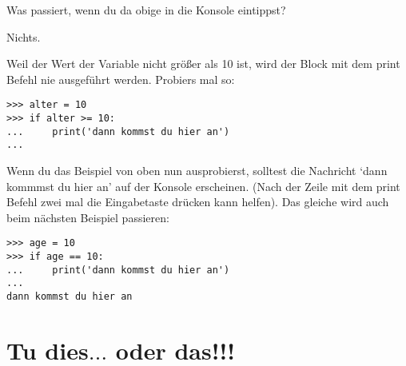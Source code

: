 \noindent
Was passiert, wenn du da obige in die Konsole eintippst?
\par
\noindent
Nichts.
\par
\noindent
Weil der Wert der Variable  nicht größer als 10 ist, wird der Block mit dem print Befehl nie ausgeführt werden. Probiers mal so:

\begin{Verbatim}[frame=single]
>>> alter = 10
>>> if alter >= 10:
...     print('dann kommst du hier an')
...
\end{Verbatim}

Wenn du das Beispiel von oben nun ausprobierst, solltest die Nachricht `dann kommmst du hier an' auf der Konsole erscheinen. (Nach der Zeile mit dem print Befehl zwei mal die Eingabetaste drücken kann helfen). Das gleiche wird auch beim nächsten Beispiel passieren:

\begin{Verbatim}[frame=single]
>>> age = 10
>>> if age == 10:
...     print('dann kommst du hier an')
...
dann kommst du hier an
\end{Verbatim}

\section{Tu dies$\ldots$ oder das!!!}

